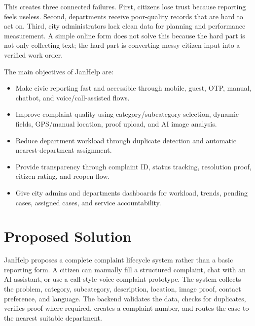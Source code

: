 \documentclass[11pt,a4paper]{article}
\begin{document}
This creates three connected failures. First, citizens lose trust because reporting feels useless. Second, departments receive poor-quality records that are hard to act on. Third, city administrators lack clean data for planning and performance measurement. A simple online form does not solve this because the hard part is not only collecting text; the hard part is converting messy citizen input into a verified work order.

The main objectives of JanHelp are:
\begin{itemize}
  \item Make civic reporting fast and accessible through mobile, guest, OTP, manual, chatbot, and voice/call-assisted flows.
  \item Improve complaint quality using category/subcategory selection, dynamic fields, GPS/manual location, proof upload, and AI image analysis.
  \item Reduce department workload through duplicate detection and automatic nearest-department assignment.
  \item Provide transparency through complaint ID, status tracking, resolution proof, citizen rating, and reopen flow.
  \item Give city admins and departments dashboards for workload, trends, pending cases, assigned cases, and service accountability.
\end{itemize}

\section*{Proposed Solution}
JanHelp proposes a complete complaint lifecycle system rather than a basic reporting form. A citizen can manually fill a structured complaint, chat with an AI assistant, or use a call-style voice complaint prototype. The system collects the problem, category, subcategory, description, location, image proof, contact preference, and language. The backend validates the data, checks for duplicates, verifies proof where required, creates a complaint number, and routes the case to the nearest suitable department.
\end{document}
